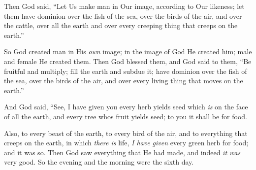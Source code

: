 \bverse Then God said, ``Let Us make man in Our image, according to Our likeness; let them have dominion over the fish of the sea, over the birds of the air, and over the cattle, over all the earth and over every creeping thing that creeps on the earth.''

\bverse So God created man in His \textit{own} image; in the image of God He created him; male and female He created them.
\bverse Then God blessed them, and God said to them, ``Be fruitful and multiply; fill the earth and subdue it; have dominion over the fish of the sea, over the birds of the air, and over every living thing that moves on the earth.''

\bverse And God said, ``See, I have given you every herb \that yields seed which \textit{is} on the face of all the earth, and every tree whos fruit yields seed; to you it shall be for food.

\bverse Also, to every beast of the earth, to every bird of the air, and to everything that creeps on the earth, in which \textit{there is} life, \textit{I have given} every green herb for food; and it was so.
\bverse Then God saw everything that He had made, and indeed \textit{it was} very good. So the evening and the morning were the sixth day.





















